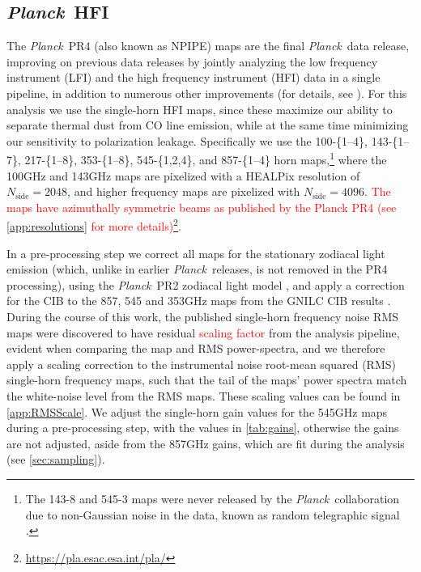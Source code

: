 \documentclass{aa}
\def\Planck{\textit{Planck}}
\def\planck{\textit{Planck}}
\def\npipe{NPIPE}
\def\,{\thinspace}
\newcommand{\edit}[1]{\textcolor{red}{#1}}
\begin{document}
\subsection{\Planck\ HFI}
\label{sec:planckhfi}
The \planck\ PR4 (also known as \npipe) maps are the final \planck\ data release, improving on previous data releases by jointly analyzing the low frequency instrument (LFI) and the  high frequency instrument (HFI) data in a single pipeline, in addition to numerous other improvements (for details, see \citealt{planck2020-LVII}). 
For this analysis we use the single-horn HFI maps, since these maximize our ability to separate thermal dust from CO line emission, while at the same time minimizing our sensitivity to polarization leakage. Specifically we use the 100-\{1--4\}, 143-\{1--7\}, 217-\{1--8\}, 353-\{1--8\}, 545-\{1,2,4\}, and 857-\{1--4\} horn maps,\footnote{The 143-8 and 545-3 maps were never released by the \planck\ collaboration due to non-Gaussian noise in the data, known as random telegraphic signal \citep{planck2013-p03}.} where the 100\,GHz and 143\,GHz maps are pixelized with a HEALPix \citep{healpix,Zonca2019} resolution of $N_{\mathrm{side}}=2048$, and higher frequency maps are pixelized with $N_{\mathrm{side}}=4096$. \edit{The maps have azimuthally symmetric beams as published by the Planck PR4 (see \cref{app:resolutions} for more details)\footnote{\url{https://pla.esac.esa.int/pla/}}.}

In a pre-processing step we correct all maps for the stationary zodiacal light emission (which, unlike in earlier \Planck\ releases, is not removed in the PR4 processing), using the \Planck\ PR2 zodiacal light model \citep{planck2014-a09, planck2013-pip88, maris2006c}, and apply a correction for the CIB to the 857, 545 and 353\,GHz maps from the GNILC CIB results \cite{planck2016-XLVIII}. During the course of this work, the published single-horn frequency noise RMS maps were discovered to have residual \edit{scaling factor}
from the analysis pipeline, evident when comparing the map and RMS power-spectra, and we therefore apply a scaling correction to the instrumental noise root-mean squared (RMS) single-horn frequency maps, such that the tail of the maps' power spectra match the white-noise level from the RMS maps. These scaling values can be found in \cref{app:RMSScale}. We adjust the single-horn gain values for the 545\,GHz maps during a pre-processing step, with the values in \cref{tab:gains}, otherwise the gains are not adjusted, aside from the 857\,GHz gains, which are fit during the analysis (see \cref{sec:sampling}).  
\end{document}
